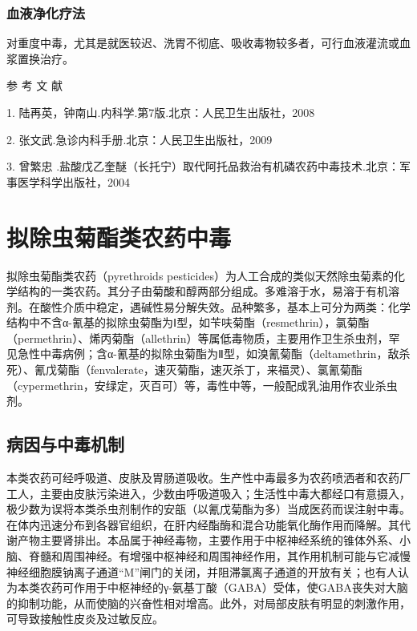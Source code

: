 \subsubsection{血液净化疗法}

对重度中毒，尤其是就医较迟、洗胃不彻底、吸收毒物较多者，可行血液灌流或血浆置换治疗。

\hypertarget{text00139.htmlux5cux23CHP5-3-1-4}{}
参 考 文 献

1. 陆再英，钟南山.内科学.第7版.北京：人民卫生出版社，2008

2. 张文武.急诊内科手册.北京：人民卫生出版社，2009

3. 曾繁忠
.盐酸戊乙奎醚（长托宁）取代阿托品救治有机磷农药中毒技术.北京：军事医学科学出版社，2004

\protect\hypertarget{text00140.html}{}{}

\section{拟除虫菊酯类农药中毒}

拟除虫菊酯类农药（pyrethroids
pesticides）为人工合成的类似天然除虫菊素的化学结构的一类农药。其分子由菊酸和醇两部分组成。多难溶于水，易溶于有机溶剂。在酸性介质中稳定，遇碱性易分解失效。品种繁多，基本上可分为两类：化学结构中不含α-氰基的拟除虫菊酯为Ⅰ型，如苄呋菊酯（resmethrin），氯菊酯（permethrin）、烯丙菊酯（allethrin）等属低毒物质，主要用作卫生杀虫剂，罕见急性中毒病例；含α-氰基的拟除虫菊酯为Ⅱ型，如溴氰菊酯（deltamethrin，敌杀死）、氰戊菊酯（fenvalerate，速灭菊酯，速灭杀丁，来福灵）、氯氰菊酯（cypermethrin，安绿定，灭百可）等，毒性中等，一般配成乳油用作农业杀虫剂。

\subsection{病因与中毒机制}

本类农药可经呼吸道、皮肤及胃肠道吸收。生产性中毒最多为农药喷洒者和农药厂工人，主要由皮肤污染进入，少数由呼吸道吸入；生活性中毒大都经口有意摄入，极少数为误将本类杀虫剂制作的安瓿（以氰戊菊酯为多）当成医药而误注射中毒。在体内迅速分布到各器官组织，在肝内经酯酶和混合功能氧化酶作用而降解。其代谢产物主要肾排出。本品属于神经毒物，主要作用于中枢神经系统的锥体外系、小脑、脊髓和周围神经。有增强中枢神经和周围神经作用，其作用机制可能与它减慢神经细胞膜钠离子通道“M”闸门的关闭，并阻滞氯离子通道的开放有关；也有人认为本类农药可作用于中枢神经的γ-氨基丁酸（GABA）受体，使GABA丧失对大脑的抑制功能，从而使脑的兴奋性相对增高。此外，对局部皮肤有明显的刺激作用，可导致接触性皮炎及过敏反应。

